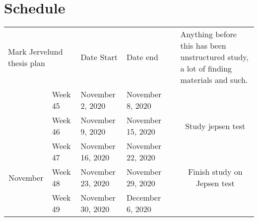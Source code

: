 \documentclass[
  a4paper,  %
  twoside,  %
  bibliography=totoc,
  headsepline,
  cleardoublepage=empty,
  parskip=half,
  draft=false
]{scrbook}
\begin{document}
\newpage
\appendix


\section{Schedule}

\begin{table}[]
\begin{tabular}{clllcc}
\multicolumn{2}{l}{Mark Jervelund thesis plan} & Date Start        & Date end          & \multicolumn{1}{l}{}                                                                     & \multicolumn{1}{l}{Anything before this has been unstructured study, a lot of finding materials and such.}                 \\
                                & Week 45      & November 2, 2020  & November 8, 2020  &                                                                                          &                                                                                                                            \\
                                & Week 46      & November 9, 2020  & November 15, 2020 &                                                                                          & \multirow{-2}{*}{Study jepsen test}                                                                                        \\
                                & Week 47      & November 16, 2020 & November 22, 2020 &                                                                                          &                                                                                                                            \\
\multirow{-4}{*}{November}      & Week 48      & November 23, 2020 & November 29, 2020 &                                                                                          & \multirow{-2}{*}{Finish study on Jepsen test}                                                                              \\
                                & Week 49      & November 30, 2020 & December 6, 2020  &                                                                                          &                                                                                                                            \\

\end{tabular}
\end{table}
\end{document}
